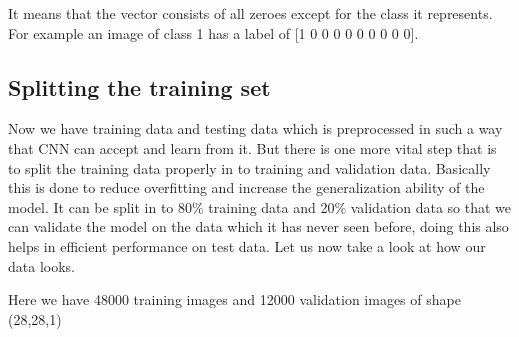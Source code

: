  It means that the vector consists of all zeroes except for the class it represents. For example an image of class 1 has a label of [1 0 0 0 0 0 0 0 0 0].
\subsection{Splitting the training set} 
Now we have training data and testing data which is preprocessed in such a way that CNN can accept and learn from it. But there is one more vital step that is to split the training data properly in to training and validation data. Basically this is done to reduce overfitting and increase the generalization ability of the model. It can be split in to 80\% training data and 20\% validation data so that we can validate the model on the data which it has never seen before, doing this also helps in efficient performance on test data. Let us now take a look at how our data looks.


Here we have 48000 training images and 12000 validation images of shape (28,28,1)
